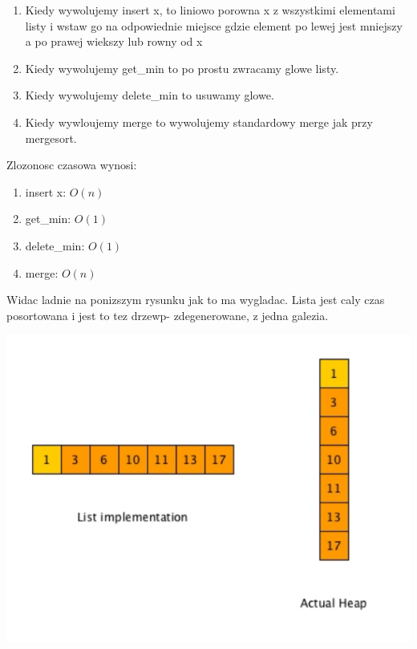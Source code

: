 \documentclass{article}
\begin{document}
\begin{tcolorbox}[colback=white!90!blue,colframe=black!35!blue,title=]

    \begin{enumerate}[label=(\arabic*)]
        \item Kiedy wywolujemy insert x, to liniowo porowna x z wszystkimi elementami listy i wstaw go na odpowiednie miejsce gdzie element po lewej jest mniejszy a po prawej wiekszy lub rowny od x
        \item Kiedy wywolujemy get\_min to po prostu zwracamy glowe listy.
        \item Kiedy wywolujemy delete\_min to usuwamy glowe.
        \item Kiedy wywloujemy merge to wywolujemy standardowy merge jak przy mergesort.
    \end{enumerate}

\end{tcolorbox}

Zlozonosc czasowa wynosi:

\begin{tcolorbox}[colback=white!90!blue,colframe=black!35!blue,title=]

    \begin{enumerate}[label=(\arabic*)]
        \item insert x: $O(n)$
        \item get\_min: $O(1)$
        \item delete\_min: $O(1)$
        \item merge: $O(n)$
        
    \end{enumerate}

\end{tcolorbox}

Widac ladnie na ponizszym rysunku jak to ma wygladac. Lista jest caly czas posortowana i jest to tez drzewp- zdegenerowane, z jedna galezia.
\begin{center}
    \begin{minipage}[h]{0.8\textwidth}
        \centering
        \includegraphics[width=1.0\textwidth]{heap_list.png}
    \end{minipage}    
\end{center}
\end{document}
